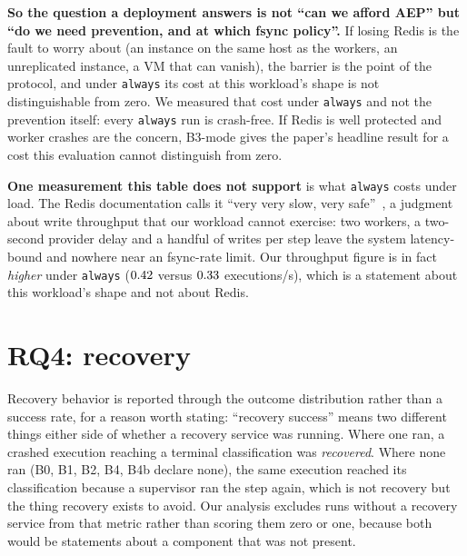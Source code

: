 \documentclass[10pt,journal,compsoc]{IEEEtran}
\begin{document}
\textbf{So the question a deployment answers is not ``can we afford AEP'' but
``do we need prevention, and at which fsync policy''.} If losing Redis is the
fault to worry about (an instance on the same host as the workers, an
unreplicated instance, a VM that can vanish), the barrier is the point of the
protocol, and under \texttt{always} its cost at this workload's shape is not
distinguishable from zero. We measured that cost under \texttt{always} and not
the prevention itself: every \texttt{always} run is crash-free. If
Redis is well protected and worker crashes are the concern, B3-mode gives the
paper's headline result for a cost this evaluation cannot distinguish from zero.

\textbf{One measurement this table does not support} is what \texttt{always}
costs under load. The Redis
documentation calls it ``very very slow, very safe''~\cite{redis-persistence}, a
judgment about write throughput that our workload cannot exercise: two workers,
a two-second provider delay and a handful of writes per step leave the system
latency-bound and nowhere near an fsync-rate limit. Our throughput figure is in
fact \emph{higher} under \texttt{always} ($0.42{}$ versus
$0.33{}$ executions/s), which is a statement about this
workload's shape and not about Redis.


\section{RQ4: recovery}
\label{supp:rq4}

Recovery behavior is reported through the outcome distribution rather than a
success rate, for a reason worth stating: ``recovery success'' means two
different things either side of whether a recovery service was running. Where
one ran, a crashed execution reaching a terminal classification was
\emph{recovered}. Where none ran (B0, B1, B2, B4, B4b declare none), the
same execution reached its classification because a supervisor ran the step
again, which is not recovery but the thing recovery exists to avoid. Our
analysis excludes runs without a recovery service from that metric rather than
scoring them zero or one, because both would be statements about a component
that was not present.
\end{document}
